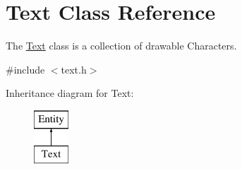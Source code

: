 \hypertarget{class_text}{}\section{Text Class Reference}
\label{class_text}


The \hyperlink{class_text}{Text} class is a collection of drawable Characters.  




{\ttfamily \#include $<$text.\+h$>$}

Inheritance diagram for Text\+:\begin{figure}[H]
\begin{center}
\leavevmode
\includegraphics[height=2.000000cm]{class_text}
\end{center}
\end{figure}
